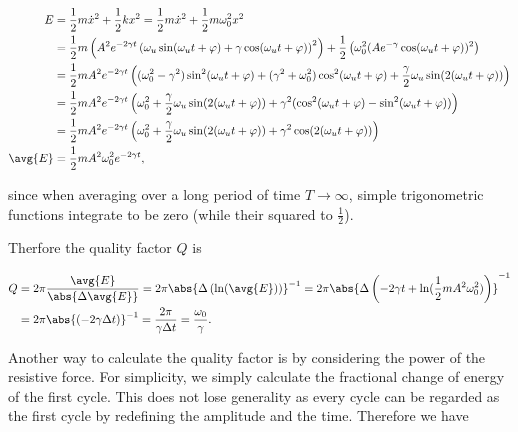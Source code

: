 \documentclass[english,a4paper,12pt]{report}
\begin{document}
\begin{equation}
    \begin{aligned} 
    E &= \frac{1}{2}m \dot{x} ^2 + \frac{1}{2}kx^2 = \frac{1}{2}m \dot{x} ^2+ \frac{1}{2} m \omega _{0}^2x^2    \\ 
    &= \frac{1}{2}m\left( A^2e^{-2\gamma t} \left(  \omega _{u}\sin (\omega _{u}t+\varphi  ) + \gamma \cos (\omega _{u}t+\varphi  )  \right)^2\right) + \frac{1}{2}\left( \omega _{0}^2   (Ae^{-\gamma } \cos (\omega _{u} t+\varphi ))^2\right) \\ 
    &= \frac{1}{2}mA^2e^{-2\gamma t} \left((\omega _{0}^2-\gamma ^2 ) \sin ^2(\omega _{u}t+\varphi)  + (\gamma ^2+\omega _{0}^2) \cos ^2(\omega _{u}t+\varphi  ) + \frac{\gamma }{2} \omega _{u}\sin (2(\omega _{u}t+\varphi  )) \right)\\
    &= \frac{1}{2}mA^2e^{-2\gamma t} \left( \omega _{0}^2 + \frac{\gamma }{2}\omega _{u}\sin (2(\omega _{u}t + \varphi  )) + \gamma ^2(\cos ^2(\omega _{u}t+\varphi  )- \sin ^2(\omega _{u}t+\varphi  )) \right) \\
    &= \frac{1}{2}mA^2e^{-2\gamma t} \left( \omega _{0}^2+ \frac{\gamma }{2}\omega _{u}\sin (2(\omega _{u}t+\varphi  )) + \gamma ^2\cos (2(\omega _{u}t+\varphi  )) \right) \\
    \avg{E} &= \frac{1}{2}mA^2\omega _{0}^2e^{-2\gamma t},
     \end{aligned} 
\end{equation}

since when averaging over a long period of time \(T \to \infty\), simple trigonometric functions integrate to be zero (while their squared to \(\frac{1}{2} \)). 

Therfore the quality factor \(Q\) is 

\begin{equation}
    \begin{aligned} 
    Q &= 2\pi \frac{\avg{E} }{\abs{\Delta \avg{E} } } = 2\pi  \abs{\Delta \left( \ln (\avg{E}  ) \right)}^{-1} = 2\pi \abs{ \Delta \left(-2\gamma t + \ln (\frac{1}{2}mA^2\omega _{0}^2  )\right)}^{-1}  \\
    &= 2\pi \abs{ (-2\gamma \Delta t)}^{-1} = \frac{2\pi }{\gamma \Delta t} = \frac{\omega _{0} }{\gamma }.   
    \end{aligned} 
\end{equation}

Another way to calculate the quality factor is by considering the power of the resistive force. For simplicity, we simply calculate the fractional change of energy of the first cycle. This does not lose generality as every cycle can be regarded as the first cycle by redefining the amplitude and the time. Therefore we have
\end{document}
